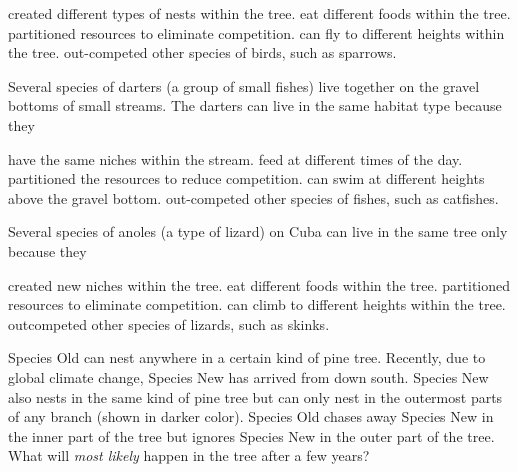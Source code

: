 \begin{choices}
	\choice created different types of nests within the tree.%
	\choice eat different foods within the tree.%
	\correctchoice partitioned resources to eliminate competition.%
	\choice can fly to different heights within the tree.%
	\choice out-competed other species of birds, such as sparrows.%
\end{choices}

\question
Several species of darters (a group of small fishes) live together on the gravel bottoms of small streams. The darters can live in the same habitat type  because they

\begin{choices}
	\choice have the same niches within the stream.%
	\choice feed at different times of the day.%
	\correctchoice partitioned the resources to reduce competition.%
	\choice can swim at different heights above the gravel bottom.%
	\choice out-competed other species of fishes, such as catfishes.%
\end{choices}

\question
Several species of anoles (a type of lizard) on Cuba can live in the same tree only because they

\begin{choices}
	\choice created new niches within the tree.%
	\choice eat different foods within the tree.%
	\correctchoice partitioned resources to eliminate competition.%
	\choice can climb to different heights within the tree.%
	\choice outcompeted other species of lizards, such as skinks.%
\end{choices}

\question
Species Old can nest anywhere in a certain kind of pine tree. Recently, due to global climate change, Species New has arrived from down south. Species New also nests in the same kind of pine tree but can only nest in the outermost parts of any branch (shown in darker color).  Species Old chases away Species New in the inner part of the tree but ignores Species New in the outer part of the tree. What will \emph{most likely} happen in the tree after a few years?

